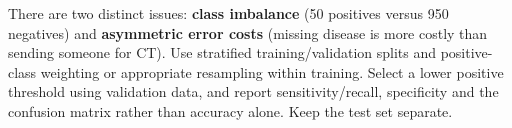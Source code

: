 There are two distinct issues: \textbf{class imbalance} (50 positives versus 950 negatives) and \textbf{asymmetric error costs} (missing disease is more costly than sending someone for CT). Use stratified training/validation splits and positive-class weighting or appropriate resampling within training. Select a lower positive threshold using validation data, and report sensitivity/recall, specificity and the confusion matrix rather than accuracy alone. Keep the test set separate.
